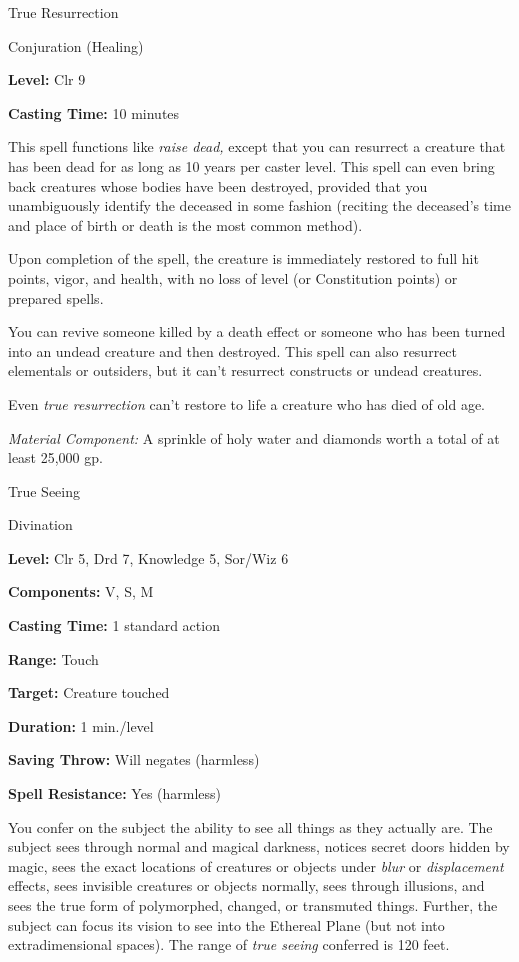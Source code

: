 \documentclass{article}
\begin{document}
\vspace{12pt}
True Resurrection

Conjuration (Healing)

\textbf{Level:} Clr 9

\textbf{Casting Time:} 10 minutes

This spell functions like \textit{raise dead, }except that you can resurrect a 
creature that has been dead for as long as 10 years per caster level. This spell 
can even bring back creatures whose bodies have been destroyed, provided that you 
unambiguously identify the deceased in some fashion (reciting the deceased's time 
and place of birth or death is the most common method).

Upon completion of the spell, the creature is immediately restored to full hit 
points, vigor, and health, with no loss of level (or Constitution points) or prepared 
spells.

You can revive someone killed by a death effect or someone who has been turned 
into an undead creature and then destroyed. This spell can also resurrect elementals 
or outsiders, but it can't resurrect constructs or undead creatures.

Even \textit{true resurrection }can't restore to life a creature who has died of 
old age.

\textit{Material Component: }A sprinkle of holy water and diamonds worth a total 
of at least 25,000 gp.

\vspace{12pt}
True Seeing

Divination

\textbf{Level:} Clr 5, Drd 7, Knowledge 5, Sor/Wiz 6

\textbf{Components:} V, S, M

\textbf{Casting Time:} 1 standard action

\textbf{Range:} Touch

\textbf{Target:} Creature touched

\textbf{Duration:} 1 min./level

\textbf{Saving Throw: }Will negates (harmless)

\textbf{Spell Resistance:} Yes (harmless)

You confer on the subject the ability to see all things as they actually are. The 
subject sees through normal and magical darkness, notices secret doors hidden by 
magic, sees the exact locations of creatures or objects under \textit{blur }or 
\textit{displacement }effects, sees invisible creatures or objects normally, sees 
through illusions, and sees the true form of polymorphed, changed, or transmuted 
things. Further, the subject can focus its vision to see into the Ethereal Plane 
(but not into extradimensional spaces). The range of \textit{true seeing }conferred 
is 120 feet.
\end{document}
